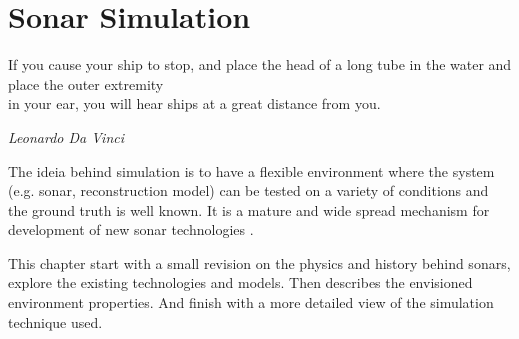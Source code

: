 \chapter{Sonar Simulation}

\epigraph{If you cause your ship to stop, and place the head of a long tube in
the water and place the outer extremity\\ in your ear, you will hear ships at a
great distance from you.}{\textit{Leonardo Da Vinci}}


The ideia behind simulation is to have a flexible environment where the system
(e.g. sonar, reconstruction model) can be tested on a variety of conditions
and the ground truth is well known. It is a mature and wide spread
mechanism for development of new sonar technologies \cite{Etter2013}.

This chapter start with a small revision on the physics and history behind
sonars, explore the existing technologies and models. Then describes the
envisioned environment properties. And finish with a more detailed view of
the simulation technique used.



